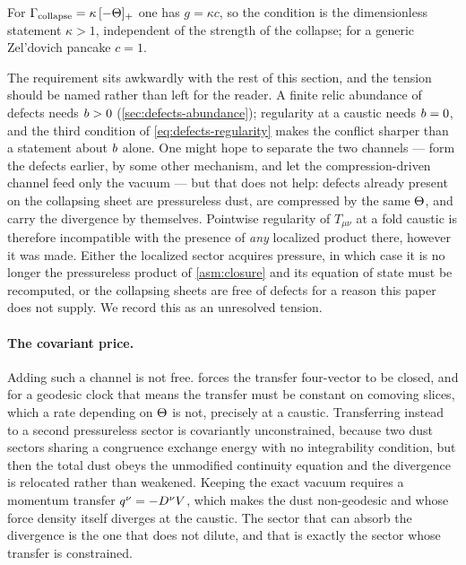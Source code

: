 For $\Gamma_{\rm collapse}=\kappa\,[-\Theta]_+$ one has $g=\kappa c$, so the
condition is the dimensionless statement $\kappa>1$, independent of the
strength of the collapse; for a generic Zel'dovich pancake $c=1$.

The requirement sits awkwardly with the rest of this section, and the tension
should be named rather than left for the reader. A finite relic abundance of
defects needs $b>0$ (\cref{sec:defects-abundance}); regularity at a
caustic needs $b=0$, and the third condition of
\cref{eq:defects-regularity} makes the conflict sharper than a statement about
$b$ alone. One might hope to separate the two channels --- form the
defects earlier, by some other mechanism, and let the compression-driven
channel feed only the vacuum --- but that does not help: defects already
present on the collapsing sheet are pressureless dust, are compressed by the
same $\Theta$, and carry the divergence by themselves. Pointwise regularity of
$T_{\mu\nu}$ at a fold caustic is therefore incompatible with the presence of
\emph{any} localized product there, however it was made. Either the localized
sector acquires pressure, in which case it is no longer the pressureless
product of \cref{asm:closure} and its equation of state must be recomputed, or
the collapsing sheets are free of defects for a reason this paper does not
supply. We record this as an unresolved tension.

\paragraph{The covariant price.} Adding such a channel is not free.
 forces the transfer four-vector to be closed,
and for a geodesic clock that means the transfer must be constant on comoving
slices, which a rate depending on $\Theta$ is not, precisely at a caustic.
Transferring instead to a second pressureless sector is covariantly
unconstrained, because two dust sectors sharing a congruence exchange energy
with no integrability condition, but then the total dust obeys the unmodified
continuity equation and the divergence is relocated rather than weakened.
Keeping the exact vacuum requires a momentum transfer $q^\nu=-D^\nu V$,
which makes the dust non-geodesic and whose force density itself diverges at
the caustic. The sector that can absorb the divergence is the one that does not
dilute, and that is exactly the sector whose transfer is constrained.

